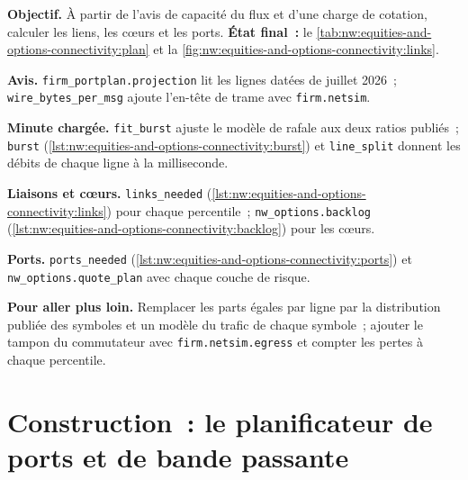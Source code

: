 \begin{tutorial}
\textbf{Objectif.} À partir de l'avis de capacité du flux et d'une charge de cotation, calculer les liens, les cœurs et les ports.
\textbf{État final~:} le \cref{tab:nw:equities-and-options-connectivity:plan} et la \cref{fig:nw:equities-and-options-connectivity:links}.
\begin{tutsteps}
\item \textbf{Avis.} \texttt{firm\_portplan.projection} lit les lignes datées de juillet 2026~; \texttt{wire\_bytes\_per\_msg} ajoute
  l'en-tête de trame avec \texttt{firm.netsim}.
\item \textbf{Minute chargée.} \texttt{fit\_burst} ajuste le modèle de rafale aux deux ratios publiés~; \texttt{burst}
  (\cref{lst:nw:equities-and-options-connectivity:burst}) et \texttt{line\_split} donnent les débits de chaque ligne à la milliseconde.
\item \textbf{Liaisons et cœurs.} \texttt{links\_needed} (\cref{lst:nw:equities-and-options-connectivity:links}) pour chaque
  percentile~; \texttt{nw\_options.backlog} (\cref{lst:nw:equities-and-options-connectivity:backlog}) pour les cœurs.
\item \textbf{Ports.} \texttt{ports\_needed} (\cref{lst:nw:equities-and-options-connectivity:ports}) et
  \texttt{nw\_options.quote\_plan} avec chaque couche de risque.
\end{tutsteps}
\textbf{Pour aller plus loin.} Remplacer les parts égales par ligne par la distribution publiée des symboles et un modèle du trafic de chaque
symbole~; ajouter le tampon du commutateur avec \texttt{firm.netsim.egress} et compter les pertes à chaque percentile.
\end{tutorial}

\section{Construction~: le planificateur de ports et de bande passante}\label{bld:nw:equities-and-options-connectivity:portplan}

